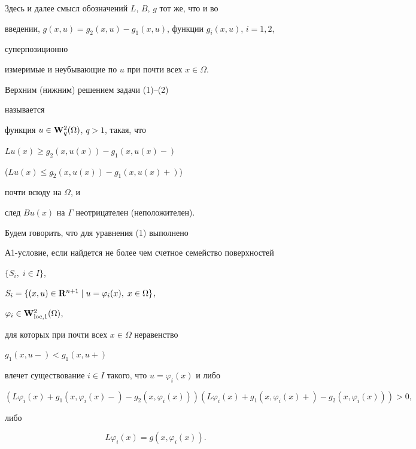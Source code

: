  


Здесь и далее смысл обозначений $L$, $B$, $g$ тот же, что и во 


введении, $g(x,u)=g_2(x,u)-g_1(x,u)$, функции $g_i(x,u)$, $i=1,2$, 


суперпозиционно 


измеримые и неубывающие по $u$ при почти всех $x\in\Omega$. 


 


\begin{defn} Верхним (нижним) решением задачи (1)--(2) 


называется 


функция $u\in\bold W^2_q(\Omega)$, $q>1$, такая, что 


$Lu(x)\ge g_2(x,u(x))-g_1(x,u(x)-)$ 


($Lu(x)\le g_2(x,u(x))-g_1(x,u(x)+)$) 


почти всюду на $\Omega$, и 


след $Bu(x)$ на $\Gamma$ неотрицателен (неположителен). 


\end{defn} 


 


\begin{defn} Будем говорить, что для уравнения (1) выполнено 


А1-условие, если найдется не более чем счетное семейство поверхностей 


$\{S_i,\;i\in I\}$, 


$S_i=\{(x,u)\in\bold R^{n+1}\mid u=\varphi_i(x),\;x\in\Omega\}$, 


$\varphi_i\in\bold W^2_{\operatorname{loc},1}(\Omega)$, 


для которых при почти всех $x\in\Omega$ неравенство 


$g_1(x,u-)<g_1(x,u+)$ 


влечет существование $i\in I$ такого, что $u=\varphi_i(x)$ и либо 


$$ 


(L\varphi_i(x)+g_1(x,\varphi_i(x)-)- 


g_2(x,\varphi_i(x)))(L\varphi_i(x)+g_1(x,\varphi_i(x)+)- 


g_2(x,\varphi_i(x)))>0,


$$ 


либо 


$$ 


L\varphi_i(x)=g(x,\varphi_i(x)). 


$$ 


\end{defn} 


